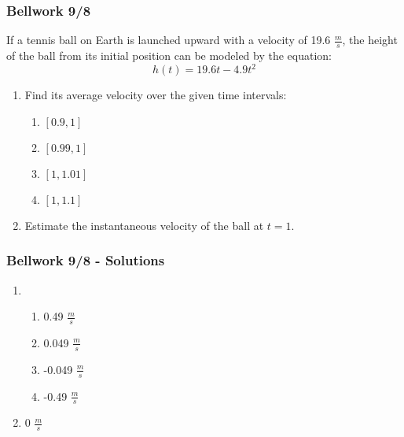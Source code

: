 \documentclass[12pt]{beamer}
\begin{document}
\begin{frame}
	\frametitle{Bellwork 9/8}
	\vspace*{\fill}
	\initclock
	\quad If a tennis ball on Earth is launched upward with a velocity of 19.6 $\tfrac{m}{s}$, the height of the ball from its initial position can be modeled by the equation: \[h(t)=19.6t-4.9t^2\]
	\begin{enumerate}
		\item Find its average velocity over the given time intervals:
		\begin{multicols}{4}
			\begin{enumerate}
				\item $[0.9, 1]$
				\item $[0.99, 1]$
				\item $[1, 1.01]$
				\item $[1, 1.1]$
			\end{enumerate}
		\end{multicols}
		\vspace*{\fill}
		\item Estimate the instantaneous velocity of the ball at $t=1$.
	\end{enumerate}
	\vspace*{\fill}
	\vspace*{\fill}
	\crono
\end{frame}
\begin{frame}
	\frametitle{Bellwork 9/8 - Solutions}
	\vspace*{\fill}
	\vspace*{\fill}
	\begin{enumerate}
		\item ~ %
		\begin{multicols}{2}
			\begin{enumerate}
				\item 0.49 $\tfrac{m}{s}$
				\item 0.049 $\tfrac{m}{s}$
				\item -0.049 $\tfrac{m}{s}$
				\item -0.49 $\tfrac{m}{s}$
			\end{enumerate}
		\end{multicols}
		\vspace*{\fill}
		\item 0 $\tfrac{m}{s}$
	\end{enumerate}
	\vspace*{\fill}
	\vspace*{\fill}
\end{frame}
\end{document}
